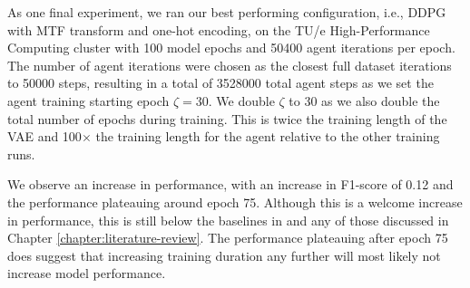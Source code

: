 As one final experiment, we ran our best performing configuration, i.e., DDPG with MTF transform and one-hot encoding, on the TU/e High-Performance Computing cluster with 100 model epochs and 50400 agent iterations per epoch.
The number of agent iterations were chosen as the closest full dataset iterations to 50000 steps, resulting in a total of 3528000 total agent steps as we set the agent training starting epoch $\zeta = 30$.
We double $\zeta$ to 30 as we also double the total number of epochs during training.
This is twice the training length of the VAE and 100$\times$ the training length for the agent relative to the other training runs.

We observe an increase in performance, with an increase in F1-score of 0.12 and the performance plateauing around epoch 75.
Although this is a welcome increase in performance, this is still below the baselines in \cite{zheng2019zero} and any of those discussed in Chapter \ref{chapter:literature-review}.
The performance plateauing after epoch 75 does suggest that increasing training duration any further will most likely not increase model performance.
